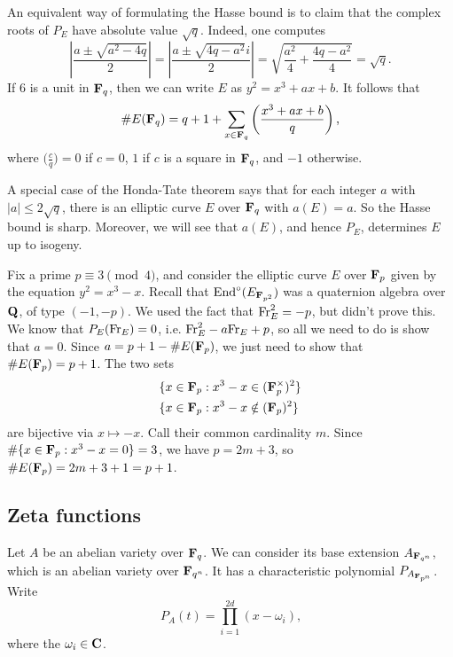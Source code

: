 \begin{center}
\end{center}


An equivalent way of formulating the Hasse bound is to claim that the complex 
roots of $P_E$ have absolute value $\sqrt q$. Indeed, one computes 
\[
  \left|\frac{a\pm \sqrt{a^2-4 q}}{2}\right| 
    = \left|\frac{a\pm \sqrt{4 q-a^2} i}{2}\right| 
    = \sqrt{\frac{a^2}{4} + \frac{4 q-a^2}{4}}
    = \sqrt q \text{.}
\]
If $6$ is a unit in $\mathbf{F}_q$, then we can write $E$ as $y^2=x^3+a x+b$. It 
follows that 
\[
  \# E(\mathbf{F}_q) = q+1 + \sum_{x\in \mathbf{F}_q} \left(\frac{x^3+a x+b}{q}\right) \text{,}
\]
where $\big(\frac{c}{q}\big)=0$ if $c=0$, $1$ if $c$ is a square in $\mathbf{F}_q$, 
and $-1$ otherwise. 

A special case of the Honda-Tate theorem says that for each integer $a$ with 
$|a|\leqslant 2\sqrt{q}$, there is an elliptic curve $E$ over $\mathbf{F}_q$ with 
$a(E)=a$. So the Hasse bound is sharp. Moreover, we will see that $a(E)$, and 
hence $P_E$, determines $E$ up to isogeny. 

\begin{example}\label{eg:serre}
Fix a prime $p\equiv 3\pmod 4$, and consider the elliptic curve $E$ over 
$\mathbf{F}_p$ given by the equation $y^2=x^3-x$. Recall that 
$\operatorname{End}^\circ(E_{\mathbf{F}_{p^2}})$ was a quaternion algebra over $\mathbf{Q}$, of type 
$(-1,-p)$. We used the fact that $\mathrm{Fr}_E^2=-p$, but didn't prove this. We 
know that $P_E(\mathrm{Fr}_E)=0$, i.e. $\mathrm{Fr}_E^2-a \mathrm{Fr}_E+p$, so all we need to do 
is show that $a=0$. Since $a=p+1-\# E(\mathbf{F}_p)$, we just need to show that 
$\# E(\mathbf{F}_p)=p+1$. The two sets 
\begin{align*}
  \{x\in \mathbf{F}_p &: x^3-x\in (\mathbf{F}_p^\times)^2\} \\
  \{x\in \mathbf{F}_p &: x^3-x\notin (\mathbf{F}_p)^2\}
\end{align*}
are bijective via $x\mapsto -x$. Call their common cardinality $m$. 
Since $\#\{x\in \mathbf{F}_p:x^3-x=0\} = 3$, we have $p=2 m+3$, so 
$\# E(\mathbf{F}_p)=2 m+3+1=p+1$. 
\end{example}


\subsection{Zeta functions}

Let $A$ be an abelian variety over $\mathbf{F}_q$. We can consider its base extension 
$A_{\mathbf{F}_{q^n}}$, which is an abelian variety over $\mathbf{F}_{q^n}$. It has a 
characteristic polynomial $P_{A_{\mathbf{F}_{p^n}}}$. Write 
\[
  P_A(t) = \prod_{i=1}^{2 d} (x-\omega_i) \text{,}
\]
where the $\omega_i\in \mathbf{C}$. 

